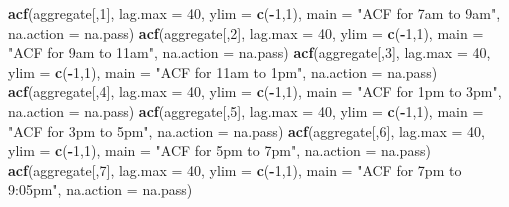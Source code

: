 \documentclass[
]{article}
\newenvironment{Shaded}{\begin{snugshade}}{\end{snugshade}}
\newcommand{\AttributeTok}[1]{\textcolor[rgb]{0.13,0.29,0.53}{#1}}
\newcommand{\DecValTok}[1]{\textcolor[rgb]{0.00,0.00,0.81}{#1}}
\newcommand{\FunctionTok}[1]{\textcolor[rgb]{0.13,0.29,0.53}{\textbf{#1}}}
\newcommand{\NormalTok}[1]{#1}
\newcommand{\SpecialCharTok}[1]{\textcolor[rgb]{0.81,0.36,0.00}{\textbf{#1}}}
\newcommand{\StringTok}[1]{\textcolor[rgb]{0.31,0.60,0.02}{#1}}
\begin{document}
\begin{Shaded}
\begin{Highlighting}[]
\FunctionTok{acf}\NormalTok{(aggregate[,}\DecValTok{1}\NormalTok{], }\AttributeTok{lag.max =} \DecValTok{40}\NormalTok{, }
    \AttributeTok{ylim =} \FunctionTok{c}\NormalTok{(}\SpecialCharTok{{-}}\DecValTok{1}\NormalTok{,}\DecValTok{1}\NormalTok{), }\AttributeTok{main =} \StringTok{"ACF for 7am to 9am"}\NormalTok{,}
    \AttributeTok{na.action =}\NormalTok{ na.pass)}
\FunctionTok{acf}\NormalTok{(aggregate[,}\DecValTok{2}\NormalTok{], }\AttributeTok{lag.max =} \DecValTok{40}\NormalTok{, }
    \AttributeTok{ylim =} \FunctionTok{c}\NormalTok{(}\SpecialCharTok{{-}}\DecValTok{1}\NormalTok{,}\DecValTok{1}\NormalTok{), }\AttributeTok{main =} \StringTok{"ACF for 9am to 11am"}\NormalTok{,}
    \AttributeTok{na.action =}\NormalTok{ na.pass)}
\FunctionTok{acf}\NormalTok{(aggregate[,}\DecValTok{3}\NormalTok{], }\AttributeTok{lag.max =} \DecValTok{40}\NormalTok{, }
    \AttributeTok{ylim =} \FunctionTok{c}\NormalTok{(}\SpecialCharTok{{-}}\DecValTok{1}\NormalTok{,}\DecValTok{1}\NormalTok{), }\AttributeTok{main =} \StringTok{"ACF for 11am to 1pm"}\NormalTok{,}
    \AttributeTok{na.action =}\NormalTok{ na.pass)}
\FunctionTok{acf}\NormalTok{(aggregate[,}\DecValTok{4}\NormalTok{], }\AttributeTok{lag.max =} \DecValTok{40}\NormalTok{, }
    \AttributeTok{ylim =} \FunctionTok{c}\NormalTok{(}\SpecialCharTok{{-}}\DecValTok{1}\NormalTok{,}\DecValTok{1}\NormalTok{), }\AttributeTok{main =} \StringTok{"ACF for 1pm to 3pm"}\NormalTok{,}
    \AttributeTok{na.action =}\NormalTok{ na.pass)}
\FunctionTok{acf}\NormalTok{(aggregate[,}\DecValTok{5}\NormalTok{], }\AttributeTok{lag.max =} \DecValTok{40}\NormalTok{, }
    \AttributeTok{ylim =} \FunctionTok{c}\NormalTok{(}\SpecialCharTok{{-}}\DecValTok{1}\NormalTok{,}\DecValTok{1}\NormalTok{), }\AttributeTok{main =} \StringTok{"ACF for 3pm to 5pm"}\NormalTok{,}
    \AttributeTok{na.action =}\NormalTok{ na.pass)}
\FunctionTok{acf}\NormalTok{(aggregate[,}\DecValTok{6}\NormalTok{], }\AttributeTok{lag.max =} \DecValTok{40}\NormalTok{, }
    \AttributeTok{ylim =} \FunctionTok{c}\NormalTok{(}\SpecialCharTok{{-}}\DecValTok{1}\NormalTok{,}\DecValTok{1}\NormalTok{), }\AttributeTok{main =} \StringTok{"ACF for 5pm to 7pm"}\NormalTok{,}
    \AttributeTok{na.action =}\NormalTok{ na.pass)}
\FunctionTok{acf}\NormalTok{(aggregate[,}\DecValTok{7}\NormalTok{], }\AttributeTok{lag.max =} \DecValTok{40}\NormalTok{, }
    \AttributeTok{ylim =} \FunctionTok{c}\NormalTok{(}\SpecialCharTok{{-}}\DecValTok{1}\NormalTok{,}\DecValTok{1}\NormalTok{), }\AttributeTok{main =} \StringTok{"ACF for 7pm to 9:05pm"}\NormalTok{,}
    \AttributeTok{na.action =}\NormalTok{ na.pass)}
\end{Highlighting}
\end{Shaded}
\end{document}
